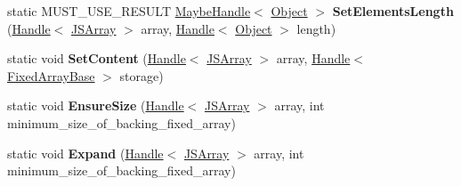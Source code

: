\begin{DoxyCompactItemize}
\item 
\hypertarget{classv8_1_1internal_1_1_j_s_array_a07a014fd8f656c543bf90fcd95183080}{}static M\+U\+S\+T\+\_\+\+U\+S\+E\+\_\+\+R\+E\+S\+U\+L\+T \hyperlink{classv8_1_1internal_1_1_maybe_handle}{Maybe\+Handle}$<$ \hyperlink{classv8_1_1internal_1_1_object}{Object} $>$ {\bfseries Set\+Elements\+Length} (\hyperlink{classv8_1_1internal_1_1_handle}{Handle}$<$ \hyperlink{classv8_1_1internal_1_1_j_s_array}{J\+S\+Array} $>$ array, \hyperlink{classv8_1_1internal_1_1_handle}{Handle}$<$ \hyperlink{classv8_1_1internal_1_1_object}{Object} $>$ length)\label{classv8_1_1internal_1_1_j_s_array_a07a014fd8f656c543bf90fcd95183080}

\item 
\hypertarget{classv8_1_1internal_1_1_j_s_array_a41f6ed171dd4166868145bfbd59ae829}{}static void {\bfseries Set\+Content} (\hyperlink{classv8_1_1internal_1_1_handle}{Handle}$<$ \hyperlink{classv8_1_1internal_1_1_j_s_array}{J\+S\+Array} $>$ array, \hyperlink{classv8_1_1internal_1_1_handle}{Handle}$<$ \hyperlink{classv8_1_1internal_1_1_fixed_array_base}{Fixed\+Array\+Base} $>$ storage)\label{classv8_1_1internal_1_1_j_s_array_a41f6ed171dd4166868145bfbd59ae829}

\item 
\hypertarget{classv8_1_1internal_1_1_j_s_array_a0c716107eaf669181637d1712d09517e}{}static void {\bfseries Ensure\+Size} (\hyperlink{classv8_1_1internal_1_1_handle}{Handle}$<$ \hyperlink{classv8_1_1internal_1_1_j_s_array}{J\+S\+Array} $>$ array, int minimum\+\_\+size\+\_\+of\+\_\+backing\+\_\+fixed\+\_\+array)\label{classv8_1_1internal_1_1_j_s_array_a0c716107eaf669181637d1712d09517e}

\item 
\hypertarget{classv8_1_1internal_1_1_j_s_array_a6dc279e649d5dfdbf7c0ece8eaedc83a}{}static void {\bfseries Expand} (\hyperlink{classv8_1_1internal_1_1_handle}{Handle}$<$ \hyperlink{classv8_1_1internal_1_1_j_s_array}{J\+S\+Array} $>$ array, int minimum\+\_\+size\+\_\+of\+\_\+backing\+\_\+fixed\+\_\+array)\label{classv8_1_1internal_1_1_j_s_array_a6dc279e649d5dfdbf7c0ece8eaedc83a}

\end{DoxyCompactItemize}
